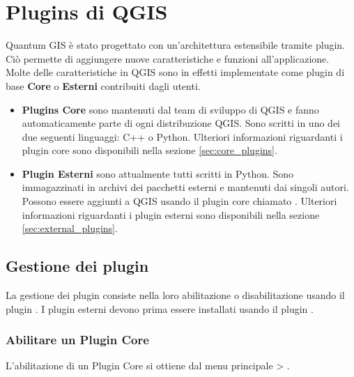 
\section{Plugins di QGIS}\label{sec:plugins}


Quantum GIS è stato progettato con un'architettura estensibile tramite plugin. Ciò permette di aggiungere nuove caratteristiche e funzioni
all'applicazione. Molte delle caratteristiche in QGIS sono in effetti implementate come plugin di
base \textbf{Core} o \textbf{Esterni} contribuiti dagli utenti. 

\begin{itemize}
\item \textbf{Plugins Core} sono mantenuti dal team di sviluppo di QGIS e fanno automaticamente parte di ogni distribuzione QGIS.
Sono scritti in uno dei due seguenti linguaggi: C++ o Python.
Ulteriori informazioni riguardanti i plugin core sono disponibili nella sezione  \ref{sec:core_plugins}.
\item \textbf{Plugin Esterni} sono attualmente tutti scritti in Python.
Sono immagazzinati in archivi dei pacchetti esterni e mantenuti dai singoli autori.
Possono essere aggiunti a QGIS usando il plugin core chiamato .
Ulteriori informazioni riguardanti i plugin esterni sono disponibili nella sezione \ref{sec:external_plugins}.
\end{itemize}

\subsection{Gestione dei plugin}\label{sec:managing_plugins}

La gestione dei plugin consiste nella loro abilitazione o disabilitazione usando il plugin .
I plugin esterni devono prima essere installati usando il plugin .

\subsubsection{Abilitare un Plugin Core}\label{sec:load_core_plugin} 

L'abilitazione di un Plugin Core si ottiene dal menu principale  > .

